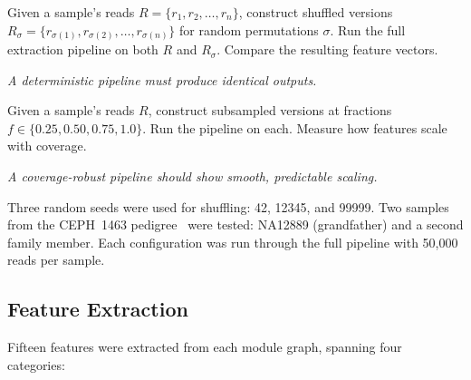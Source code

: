 \documentclass{../yalumba}
\begin{document}
\begin{definition}
Given a sample's reads $R = \{r_1, r_2, \ldots, r_n\}$, construct shuffled
versions $R_\sigma = \{r_{\sigma(1)}, r_{\sigma(2)}, \ldots, r_{\sigma(n)}\}$
for random permutations $\sigma$. Run the full extraction pipeline on both $R$
and $R_\sigma$. Compare the resulting feature vectors.

\textit{A deterministic pipeline must produce identical outputs.}
\end{definition}

\begin{definition}
Given a sample's reads $R$, construct subsampled versions at fractions
$f \in \{0.25, 0.50, 0.75, 1.0\}$. Run the pipeline on each. Measure how
features scale with coverage.

\textit{A coverage-robust pipeline should show smooth, predictable scaling.}
\end{definition}

Three random seeds were used for shuffling: 42, 12345, and 99999. Two samples
from the CEPH~1463 pedigree~\cite{eberle2017platinum} were tested: NA12889
(grandfather) and a second family member. Each configuration was run through
the full pipeline with 50,000 reads per sample.

\subsection{Feature Extraction}
\label{sec:features}

Fifteen features were extracted from each module graph, spanning four categories:
\end{document}
